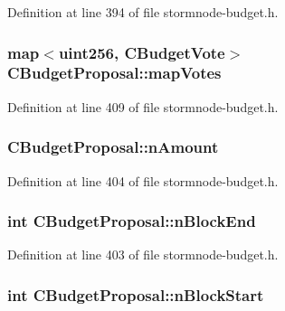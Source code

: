 Definition at line 394 of file stormnode-\/budget.\+h.

\hypertarget{class_c_budget_proposal_a83239972ab9db545206ac7e59740bfab}{}
\subsubsection[{map\+Votes}]{\setlength{\rightskip}{0pt plus 5cm}map$<${\bf uint256}, {\bf C\+Budget\+Vote}$>$ C\+Budget\+Proposal\+::map\+Votes}\label{class_c_budget_proposal_a83239972ab9db545206ac7e59740bfab}


Definition at line 409 of file stormnode-\/budget.\+h.

\hypertarget{class_c_budget_proposal_ad40f0d2ff6c0bef605d405fbcb36136c}{}
\subsubsection[{n\+Amount}]{ C\+Budget\+Proposal\+::n\+Amount}\label{class_c_budget_proposal_ad40f0d2ff6c0bef605d405fbcb36136c}


Definition at line 404 of file stormnode-\/budget.\+h.

\hypertarget{class_c_budget_proposal_a384863d009b95fd48d50f41891e41840}{}
\subsubsection[{n\+Block\+End}]{\setlength{\rightskip}{0pt plus 5cm}int C\+Budget\+Proposal\+::n\+Block\+End}\label{class_c_budget_proposal_a384863d009b95fd48d50f41891e41840}


Definition at line 403 of file stormnode-\/budget.\+h.

\hypertarget{class_c_budget_proposal_a40a5d7e56c5ef1636b48bb67e6619e32}{}
\subsubsection[{n\+Block\+Start}]{\setlength{\rightskip}{0pt plus 5cm}int C\+Budget\+Proposal\+::n\+Block\+Start}\label{class_c_budget_proposal_a40a5d7e56c5ef1636b48bb67e6619e32}


